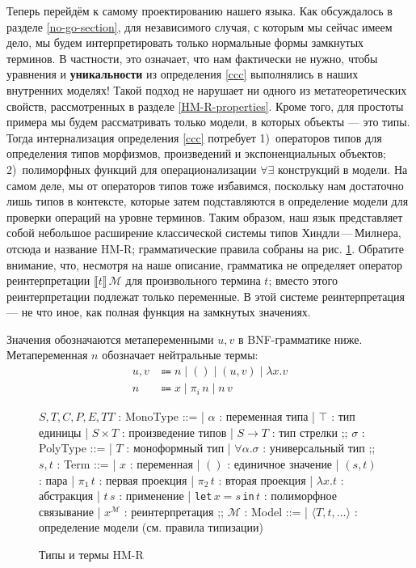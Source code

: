 Теперь перейдём к самому проектированию нашего языка.
Как обсуждалось в разделе \ref{no-go-section}, для
независимого случая, с которым мы сейчас имеем дело, мы
будем интерпретировать только нормальные формы
замкнутых терминов. В частности, это означает, что нам
фактически не нужно, чтобы уравнения и
\textbf{уникальности} из определения \ref{ccc}
выполнялись в наших внутренних моделях! Такой подход не
нарушает ни одного из метатеоретических свойств,
рассмотренных в разделе \ref{HM-R-properties}. Кроме
того, для простоты примера мы будем рассматривать
только модели, в которых объекты --- это типы. Тогда
интернализация определения \ref{ccc} потребует
1)~операторов типов для определения типов морфизмов,
произведений и экспоненциальных объектов;
2)~полиморфных функций для операционализации
$\forall\exists$ конструкций в модели. На самом деле,
мы от операторов типов тоже избавимся, поскольку нам
достаточно лишь типов в контексте, которые затем
подставляются в определение модели для проверки
операций на уровне терминов. Таким образом, наш язык
представляет собой небольшое расширение классической
системы типов Хиндли\,---\,Милнера, отсюда и название
HM-R; грамматические правила собраны на рис.
\ref{hm-r-grammar}. Обратите внимание, что, несмотря на
наше описание, грамматика не определяет оператор
реинтерпретации $\llbracket t\rrbracket\,\mathcal{M}$
для произвольного термина $t$; вместо этого
реинтерпретации подлежат только переменные. В этой
системе реинтерпретация --- не что иное, как полная
функция на замкнутых значениях.

\begin{definition}[Значения в HM-R]
    Значения обозначаются метапеременными $u, v$ в
    BNF-грамматике ниже. Метапеременная $n$ обозначает
    нейтральные термы:
    \begin{align*}
        u,v&\Coloneqq
            n\;|\;()\;|\;(u,v)\;|\;\lambda x.v\\
        n&\Coloneqq x\;|\;\pi_i\,n\;|\;n\,v
    \end{align*}
\end{definition}

\begin{figure}
    \centering
    \begin{bnf}
        $S,T,C,P,E,TT$ : \textsf{MonoType} ::=
        | $\alpha$ : переменная типа
        | $\top$ : тип единицы
        | $S\times T$ : произведение типов
        | $S\to T$ : тип стрелки
        ;;
        $\sigma$ : \textsf{PolyType} ::=
        | $T$ : моноформный тип
        | $\forall\alpha.\sigma$ : универсальный тип
        ;;
        $s,t$ : \textsf{Term} ::=
        | $x$ : переменная
        | $()$ : единичное значение
        | $(s, t)$ : пара
        | $\pi_1\,t$ : первая проекция
        | $\pi_2\,t$ : вторая проекция
        | $\lambda x. t$ : абстракция
        | $t\,s$ : применение
        | \texttt{let}\,$x=s$\,\texttt{in}\,$t$
        : полиморфное связывание
        | $x^\mathcal{M}$ : реинтерпретация
        ;;
        $\mathcal{M}$ : \textsf{Model} ::=
        | $\langle T, t, \ldots \rangle$
        : определение модели (см. правила типизации)
    \end{bnf}
    \caption{Типы и термы HM-R}
    \label{hm-r-grammar}
\end{figure}

